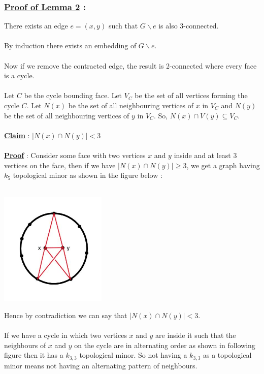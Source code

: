 \documentclass{article}
\begin{document}
    \subsubsection*{\underline{\textbf{Proof of Lemma 2}} :}
    There exists an edge $e = (x,y)$ such that $G \backslash e$ is also 3-connected.
    \\\\
    By induction there exists an embedding of $G \backslash e$.
    \\\\
    Now if we remove the contracted edge, the result is 2-connected where every face is a cycle.
    \\\\
    Let $C$ be the cycle bounding face. Let $V_{C}$ be the set of all vertices forming the cycle $C$. Let $N(x)$ be the set of all neighbouring vertices of $x$ in $V_{C}$ and $N(y)$ be the set of all neighbouring vertices of $y$ in $V_{C}$. So, $N(x) \cap V(y) \subseteq V_{C}$.
    \\\\
    \underline{\textbf{Claim}} : $ |N(x) \cap N(y)|<3$
    \\\\
    \underline{\textbf{Proof}} : 
    Consider some face with two vertices $x$ and $y$ inside and at least 3 vertices on the face, then if we have  $ |N(x) \cap N(y)| \geq 3$, we get a graph having $k_{5}$ topological minor as shown in the figure below : 
    \\\\
    \centerline{\includegraphics[width=2in]{Images/k5.jpg}} 
    Hence by contradiction we can say that $ |N(x) \cap N(y)|<3 $.
    \\\\
    If we have a cycle in which two vertices $x$ and $y$ are inside it such that the neighbours of $x$ and $y$ on the cycle are in alternating order as shown in following figure then it has a $k_{3,3}$ topological minor. So not having a $k_{3,3}$ as a topological minor means not having an alternating pattern of neighbours.
\end{document}
